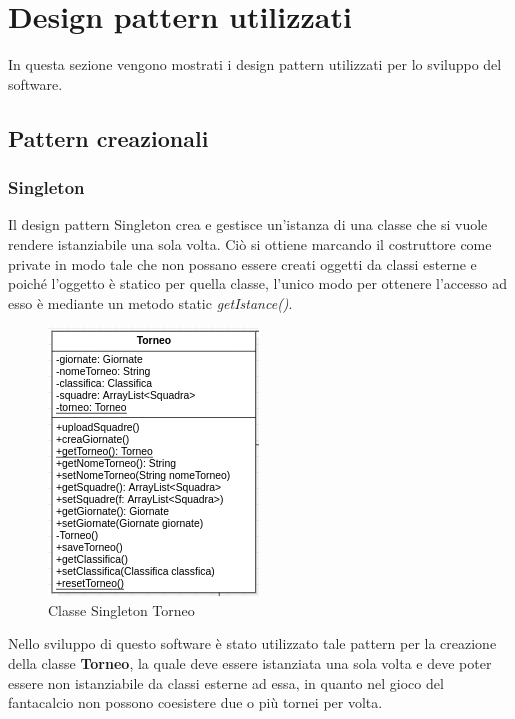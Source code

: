 \documentclass[12pt,a4paper]{article}
\begin{document}
\section{Design pattern utilizzati}
In questa sezione vengono mostrati i design pattern utilizzati per lo sviluppo del software.
 \subsection{Pattern creazionali}
 \subsubsection{Singleton}
Il design pattern Singleton crea e gestisce un'istanza di una classe che si vuole rendere istanziabile una sola volta. Ciò si ottiene marcando il costruttore come private in modo tale che non possano essere creati oggetti da classi esterne e poiché l'oggetto è statico per quella classe, l'unico modo per ottenere l'accesso ad esso è  mediante  un metodo static \textit{getIstance()}.\\
\begin{figure}[h]
\centering
\includegraphics[width=8 cm,keepaspectratio]{Singleton}
\caption{Classe Singleton Torneo}
\end{figure}
\newline
Nello sviluppo di  questo software è stato utilizzato tale pattern per la creazione della classe \textbf{Torneo}, la quale deve essere istanziata una sola volta e  deve poter essere non istanziabile da classi esterne ad essa, in quanto nel gioco del fantacalcio non possono coesistere due o più tornei per volta.
\newpage
\end{document}
